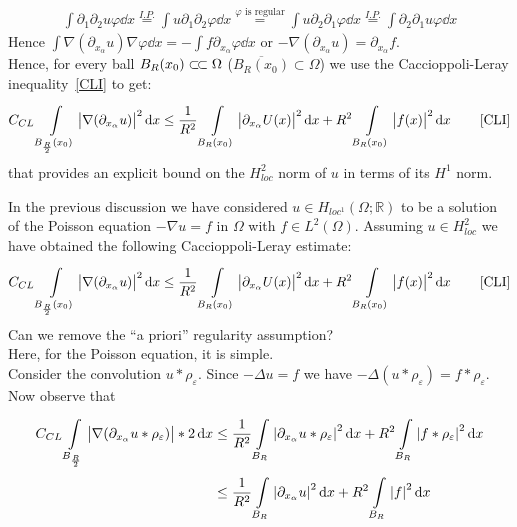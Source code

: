 \begin{gather}
	\int \partial_{1}\partial_{2} u \varphi  \dd{x} \overset{I.P.}{=} \int u \partial_{1} \partial_{2} \varphi  \dd{x} \overset{\varphi \text{ is regular}}{=} \int u \partial_{2}\partial_{1} \varphi \dd{x} \overset{I.P.}{=} \int \partial_{2}\partial_{1}u \varphi \dd{x}
\end{gather}
Hence \( \int \nabla (\partial_{x_{\alpha }}u) \nabla \varphi  \dd{x} = -\int f \partial_{x_{\alpha }}\varphi  \dd{x} \) or \( -\nabla (\partial_{x_{\alpha }}u) = \partial_{x_{\alpha}}f \).\\
Hence, for every ball \( B_{R} (x_{0}) \ssubset \Omega  \) (\( \overline{B_{R} (x_{0})} \subset \Omega  \)) we use the Caccioppoli-Leray inequality~\eqref{CLI}  to get:
\begin{gather}
	C_{CL} \int\limits_{B_{\frac{R}{2}}(x_{0})}^{} \abs{\nabla (\partial_{x_{\alpha }}u) }^{2} \dd{x} \leq \frac{1}{R^{2}} \int\limits_{B_{R}(x_{0})}^{} \abs{\partial_{x_{\alpha }}U(x) }^{2} \dd{x} + R^{2} \int\limits_{B_{R}(x_{0})}^{} \abs{f(x) }^{2} \dd{x} \qquad \text{\eqref{CLI}}
\end{gather}
that provides an explicit bound on the \( H_{loc}^{2} \) norm of \( u \) in terms of its \( H^{1} \) norm.\\
\par
In the previous discussion we have considered \( u \in H_{loc^{1}}(\Omega ; \mathbb{R})  \) to be a solution of the Poisson equation \( -\nabla u = f \) in \( \Omega  \) with \( f \in L^{2}(\Omega ) \). Assuming \( u\in H_{loc}^{2} \) we have obtained the following Caccioppoli-Leray estimate:
\begin{gather}
	C_{CL} \int\limits_{B_{\frac{R}{2}}(x_{0})}^{} \abs{\nabla (\partial_{x_{\alpha }}u) }^{2} \dd{x} \leq \frac{1}{R^{2}} \int\limits_{B_{R}(x_{0})}^{} \abs{\partial_{x_{\alpha }}U(x) }^{2} \dd{x} + R^{2} \int\limits_{B_{R}(x_{0})}^{} \abs{f(x) }^{2} \dd{x} \qquad \text{\eqref{CLI}}
\end{gather}
Can we remove the \enquote{a priori} regularity assumption?\\
Here, for the Poisson equation, it is simple.\\
Consider the convolution \( u \ast \rho_{\varepsilon } \). Since \( -\Delta  u = f \) we have \( -\Delta  (u \ast \rho_{\varepsilon }) = f\ast \rho _{\varepsilon }\).\\
Now observe that
\begin{align}
	C_{CL} \int\limits_{B_{\frac{R}{2}}}^{} \abs{\nabla (\partial_{x_{\alpha }}u\ast \rho _{\varepsilon })}*2 \dd{x} & \leq \frac{1}{R^{2}}\int\limits_{B_{R}}^{} \abs{\partial_{x_{\alpha }}u \ast \rho _{\varepsilon }}^{2} \dd{x} + R^{2}\int\limits_{B_{R}}^{} \abs{f\ast \rho _{\varepsilon }}^{2} \dd{x}  \\
	                                                                                                                 & \leq  \frac{1}{R^{2}} \int\limits_{B_{R}}^{} \abs{\partial_{x_{\alpha }}u}^{2} \dd{x} + R^{2} \int\limits_{B_{R}}^{} \abs{f}^{2} \dd{x}
\end{align}
